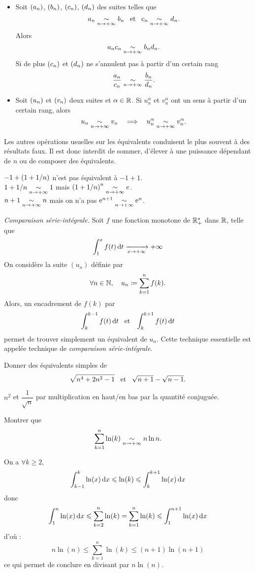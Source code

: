 \documentclass{magnolia}
\begin{document}
\begin{proposition}[utile=-3]
$\quad$
\begin{itemize}
\item Soit $\left(a_n\right)$, $\left(b_n\right)$, $\left(c_n\right)$, $\left(d_n\right)$ des suites telles que
  \[a_n \underset{n\rightarrow +\infty}{\sim} b_n \quad\!\text{et}\quad\! c_n \underset{n\rightarrow +\infty}{\sim} d_n.\]
  Alors
  \[a_n c_n \underset{n\rightarrow +\infty}{\sim}  b_n d_n.\]
  Si de plus $\left(c_n\right)$ et $\left(d_n\right)$ ne s'annulent pas à partir d'un certain
  rang
  \[\frac{a_n}{c_n} \underset{n\rightarrow +\infty}{\sim} \frac{b_n}{d_n}.\]
\item Soit $\left(u_n\right)$ et $\left(v_n\right)$ deux suites et $\alpha\in\mathbb{R}$. Si
  $u_n^\alpha$ et $v_n^\alpha$ ont un sens à partir d'un certain rang, alors
  \[u_n \underset{n\rightarrow +\infty}{\sim} v_n \quad\Longrightarrow\quad
    u_n^\alpha \underset{n\rightarrow +\infty}{\sim} v_n^\alpha.\]
\end{itemize}
\end{proposition}

\begin{remarques}
\remarque Les autres opérations usuelles sur les équivalents conduisent le plus
  souvent à des résultats faux. Il est donc interdit de sommer, d'élever à une
  puissance dépendant de $n$ ou de composer des équivalents.
  
  \begin{sol}
  $-1+\left(1+1/n\right)$ n'est pas équivalent à $-1+1$.\\
  $1+1/n \underset{n\rightarrow +\infty}{\sim}{1}$ mais $\left(1+1/n\right)^n\underset{n\rightarrow +\infty}{\sim}{e}$.\\
  $n+1\underset{n\rightarrow +\infty}{\sim}{n}$ mais on n'a pas ${\rm e}^{n+1}\underset{n\rightarrow +\infty}{\sim}{{\rm e}^n}$.
  \end{sol}
\remarque \emph{Comparaison série-intégrale.}
  Soit $f$ une fonction monotone de $\mathbb{R}_+^*$ dans $\mathbb{R}$, telle que
  \[\int_{1}^{x} f(t)\,\text{d}t\xrightarrow[x\rightarrow +\infty]{} +\infty\]
  On considère la suite $(u_n)$ définie par
  \[\forall n\in\mathbb{N} ,\quad u_n\coloneqq\sum_{k=1}^n f(k).\]
  Alors, un encadrement de $f(k)$ par 
  \[\int_{k}^{k-1} f(t)\,\text{d}t \quad\!\text{et}\quad\! \int_{k}^{k+1} f(t)\,\text{d}t\]
  permet de trouver simplement un équivalent de $u_n$. Cette technique
  essentielle est appelée technique de \emph{comparaison série-intégrale}.
\end{remarques}

\begin{exos}
\exo Donner des équivalents simples de
  \[\sqrt{n^4+2n^2-1} \quad\!\text{et}\quad\! \sqrt{n+1}-\sqrt{n-1}.\]
  
  \begin{sol}
  $n^2$ et $\dfrac{1}{\sqrt{n}}$ par multiplication en haut/en bas par la quantité conjuguée.
  \end{sol}
\exo Montrer que
  \[\sum_{k=1}^n \ln(k)\underset{n\rightarrow +\infty}{\sim} n\ln n.\]

\begin{sol}
On a $\forall k\geq 2$, $$\int_{k-1}^{k} \ln(x)\,\text{d}x\leqslant \ln(k) \leqslant \int_{k}^{k+1} \ln(x)\,\text{d}x$$ donc $$\int_{1}^{n} \ln(x)\,\text{d}x\leqslant \sum_{k=2}^n\ln(k)=\sum_{k=1}^n\ln(k)\leqslant \int_{1}^{n+1} \ln(x)\,\text{d}x$$
d'où :
$$n\ln(n)\leq \sum_{k=1}^n\ln(k)\leq (n+1)\ln(n+1)$$
ce qui permet de conclure en divisant par $n\ln(n)$.

\end{sol}
\end{exos}
\end{document}
